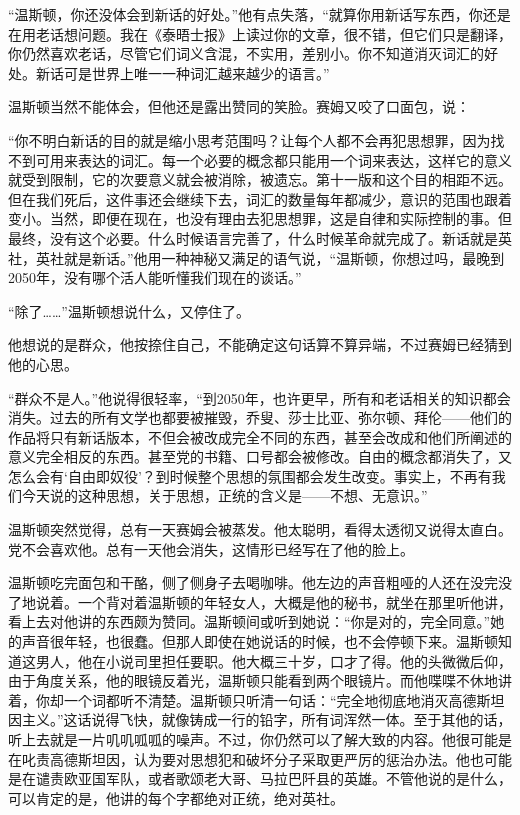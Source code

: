 ``温斯顿，你还没体会到新话的好处。''他有点失落，``就算你用新话写东西，你还是在用老话想问题。我在《泰晤士报》上读过你的文章，很不错，但它们只是翻译，你仍然喜欢老话，尽管它们词义含混，不实用，差别小。你不知道消灭词汇的好处。新话可是世界上唯一一种词汇越来越少的语言。''

温斯顿当然不能体会，但他还是露出赞同的笑脸。赛姆又咬了口面包，说：

``你不明白新话的目的就是缩小思考范围吗？让每个人都不会再犯思想罪，因为找不到可用来表达的词汇。每一个必要的概念都只能用一个词来表达，这样它的意义就受到限制，它的次要意义就会被消除，被遗忘。第十一版和这个目的相距不远。但在我们死后，这件事还会继续下去，词汇的数量每年都减少，意识的范围也跟着变小。当然，即便在现在，也没有理由去犯思想罪，这是自律和实际控制的事。但最终，没有这个必要。什么时候语言完善了，什么时候革命就完成了。新话就是英社，英社就是新话。''他用一种神秘又满足的语气说，``温斯顿，你想过吗，最晚到2050年，没有哪个活人能听懂我们现在的谈话。''

``除了\ldots\ldots''温斯顿想说什么，又停住了。

他想说的是群众，他按捺住自己，不能确定这句话算不算异端，不过赛姆已经猜到他的心思。

``群众不是人。''他说得很轻率，``到2050年，也许更早，所有和老话相关的知识都会消失。过去的所有文学也都要被摧毁，乔叟、莎士比亚、弥尔顿、拜伦------他们的作品将只有新话版本，不但会被改成完全不同的东西，甚至会改成和他们所阐述的意义完全相反的东西。甚至党的书籍、口号都会被修改。自由的概念都消失了，又怎么会有`自由即奴役'？到时候整个思想的氛围都会发生改变。事实上，不再有我们今天说的这种思想，关于思想，正统的含义是------不想、无意识。''

温斯顿突然觉得，总有一天赛姆会被蒸发。他太聪明，看得太透彻又说得太直白。党不会喜欢他。总有一天他会消失，这情形已经写在了他的脸上。

温斯顿吃完面包和干酪，侧了侧身子去喝咖啡。他左边的声音粗哑的人还在没完没了地说着。一个背对着温斯顿的年轻女人，大概是他的秘书，就坐在那里听他讲，看上去对他讲的东西颇为赞同。温斯顿间或听到她说：``你是对的，完全同意。''她的声音很年轻，也很蠢。但那人即使在她说话的时候，也不会停顿下来。温斯顿知道这男人，他在小说司里担任要职。他大概三十岁，口才了得。他的头微微后仰，由于角度关系，他的眼镜反着光，温斯顿只能看到两个眼镜片。而他喋喋不休地讲着，你却一个词都听不清楚。温斯顿只听清一句话：``完全地彻底地消灭高德斯坦因主义。''这话说得飞快，就像铸成一行的铅字，所有词浑然一体。至于其他的话，听上去就是一片叽叽呱呱的噪声。不过，你仍然可以了解大致的内容。他很可能是在叱责高德斯坦因，认为要对思想犯和破坏分子采取更严厉的惩治办法。他也可能是在谴责欧亚国军队，或者歌颂老大哥、马拉巴阡县的英雄。不管他说的是什么，可以肯定的是，他讲的每个字都绝对正统，绝对英社。

